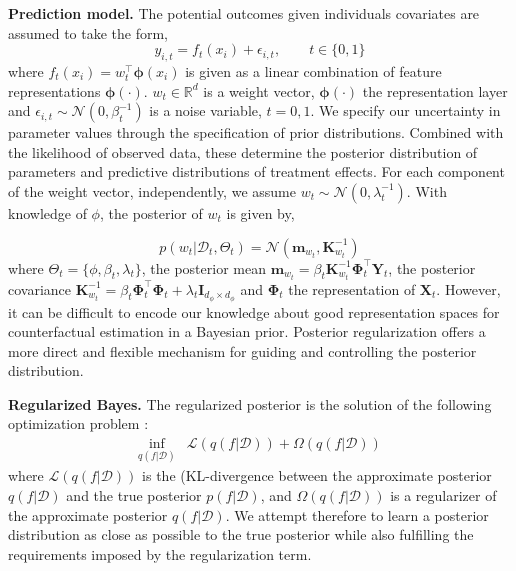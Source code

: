 \documentclass[twoside]{article}
\begin{document}
\textbf{Prediction model.} The potential outcomes given individuals covariates are assumed to take the form,
\begin{equation}\label{equ:white}
 	y_{i,t}=f_t(x_i)+\epsilon_{i,t}, \qquad t\in\{0,1\}
 \end{equation}
where $f_t(x_i) = w_t^{\top}\mathbf{\phi}(x_i)$ is given as a linear combination of feature representations $\mathbf{\phi}(\cdot)$. $w_t \in \mathbb R^d$ is a weight vector, $\mathbf{\phi}(\cdot)$ the representation layer  and $\epsilon_{i,t}\sim\mathcal N(0,\beta_t^{-1})$ is a noise variable, $t=0,1$. We specify our uncertainty in parameter values through the specification of prior distributions. Combined with the likelihood of observed data, these determine the posterior distribution of parameters and predictive distributions of treatment effects. For each component of the weight vector, independently, we assume $w_t\sim\mathcal N(0,\lambda_t^{-1})$. With knowledge of $\phi$, the posterior of $w_t$ is given by,

\begin{equation}\label{equ:mean_var}
	p(w_t|\mathcal{D}_t,\Theta_t)=\mathcal{N}(\mathbf{m}_{w_t},\mathbf{K}_{w_t}^{-1})
\end{equation}
where $\Theta_t = \{\phi,\beta_t,\lambda_t \}$, the posterior mean $\mathbf{m}_{w_t} = \beta_t\mathbf{K}_{w_t}^{-1}\mathbf{\Phi}_t^{\top}\mathbf{Y}_t$, the posterior covariance $\mathbf{K}_{w_t}^{-1}= \beta_t\mathbf{\Phi}_t^{\top}\mathbf{\Phi}_t+\lambda_t\mathbf{I}_{d_{\phi}\times d_{\phi}}
$ and $\mathbf{\Phi}_t$ the representation of $\mathbf{X}_t$. However, it can be difficult to encode our knowledge about good representation spaces for counterfactual estimation in a Bayesian prior. Posterior regularization offers a more direct and flexible mechanism for guiding and controlling the posterior distribution.

\textbf{Regularized Bayes.} The regularized posterior is the solution of the following optimization problem \cite{zhu2014bayesian,jean2018semi}:
\begin{align}\label{equ:regbayes}
\inf_{q(f|\mathcal{D})}&\mathcal{L}(q(f|\mathcal{D}))+\Omega(q(f|\mathcal{D}))
\end{align}
where $\mathcal{L}(q(f|\mathcal{D}))$ is the (KL-divergence between the approximate posterior $q(f|\mathcal{D})$ and the true posterior $p(f|\mathcal{D})$, and $\Omega(q(f|\mathcal{D}))$ is a regularizer of the approximate posterior $q(f|\mathcal{D})$. We attempt therefore to learn a posterior distribution as close as possible to the true posterior while also fulfilling the requirements imposed by the regularization term.
\end{document}
